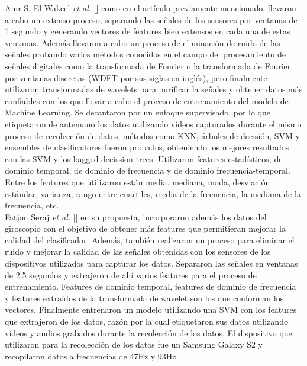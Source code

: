 Amr S. El-Wakeel {\it et al.} [] como en el artículo previamente mencionado, llevaron a cabo un extenso proceso, separando las señales de los sensores por
ventanas de 1 segundo y generando vectores de features bien extensos en cada una de estas ventanas. Además llevaron a cabo un proceso de eliminación de ruido
de las señales probando varios métodos conocidos en el campo del procesamiento de señales digitales como la transformada de Fourier o la transformada de
Fourier por ventanas discretas (WDFT por sus siglas en inglés), pero finalmente utilizaron transformadas de wavelets para purificar la señales y obtener
datos más confiables con los que llevar a cabo el proceso de entrenamiento del modelo de Machine Learning. Se decantaron por un enfoque supervisado, por lo que 
etiquetaron de antemano los datos utilizando vídeos capturados durante el mismo proceso de recolección de datos, métodos como KNN, árboles de decisión, SVM y
ensembles de clasificadores fueron probados, obteniendo los mejores resultados con las SVM y los bagged decission trees. Utilizaron features estadísticos, de
dominio temporal, de dominio de frecuencia y de dominio frecuencia-temporal. Entre los features que utilizaron están media, mediana, moda, desviación estándar,
varianza, rango entre cuartiles, media de la frecuencia, la mediana de la frecuencia, etc.\\

Fatjon Seraj {\it et al.} [] en su propuesta, incorporaron además los datos del giroscopio con el objetivo de obtener más features que permitieran mejorar la calidad
del clasificador. Además, también realizaron un proceso para eliminar el ruido y mejorar la calidad de las señales obtenidas con los sensores de los dispositivos
utilizados para capturar los datos. Separaron las señales en ventanas de 2.5 segundos y extrajeron de ahí varios features para el proceso de entrenamiento. Features
de dominio temporal, features de dominio de frecuencia y features extraídos de la transformada de wavelet son los que conforman los vectores. Finalmente entrenaron
un modelo utilizando una SVM con los features que extrajeron de los datos, razón por la cual etiquetaron sus datos utilizando vídeos y audios grabados durante la
recolección de los datos. El dispositivo que utilizaron para la recolección de los datos fue un Samsung Galaxy S2 y recopilaron datos a frecuencias de 47Hz y 93Hz.\\

